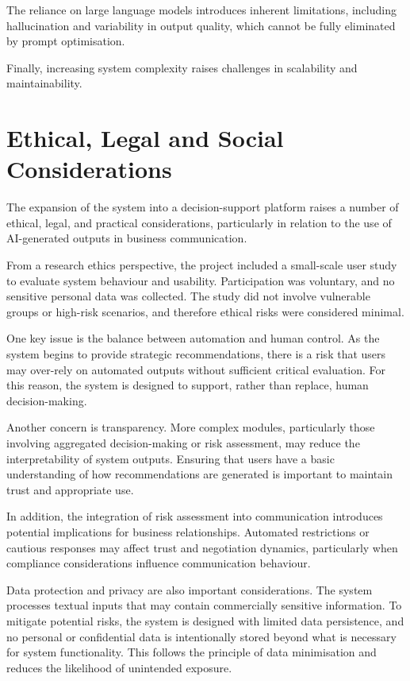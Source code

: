 \documentclass[12pt,a4paper]{report}
\begin{document}
The reliance on large language models introduces inherent limitations, including hallucination and variability in output quality, which cannot be fully eliminated by prompt optimisation.

Finally, increasing system complexity raises challenges in scalability and maintainability.

\section{Ethical, Legal and Social Considerations}

The expansion of the system into a decision-support platform raises a number of ethical, legal, and practical considerations, particularly in relation to the use of AI-generated outputs in business communication.

From a research ethics perspective, the project included a small-scale user study to evaluate system behaviour and usability. Participation was voluntary, and no sensitive personal data was collected. The study did not involve vulnerable groups or high-risk scenarios, and therefore ethical risks were considered minimal.

One key issue is the balance between automation and human control. As the system begins to provide strategic recommendations, there is a risk that users may over-rely on automated outputs without sufficient critical evaluation. For this reason, the system is designed to support, rather than replace, human decision-making.

Another concern is transparency. More complex modules, particularly those involving aggregated decision-making or risk assessment, may reduce the interpretability of system outputs. Ensuring that users have a basic understanding of how recommendations are generated is important to maintain trust and appropriate use.

In addition, the integration of risk assessment into communication introduces potential implications for business relationships. Automated restrictions or cautious responses may affect trust and negotiation dynamics, particularly when compliance considerations influence communication behaviour.

Data protection and privacy are also important considerations. The system processes textual inputs that may contain commercially sensitive information. To mitigate potential risks, the system is designed with limited data persistence, and no personal or confidential data is intentionally stored beyond what is necessary for system functionality. This follows the principle of data minimisation and reduces the likelihood of unintended exposure.
\end{document}
